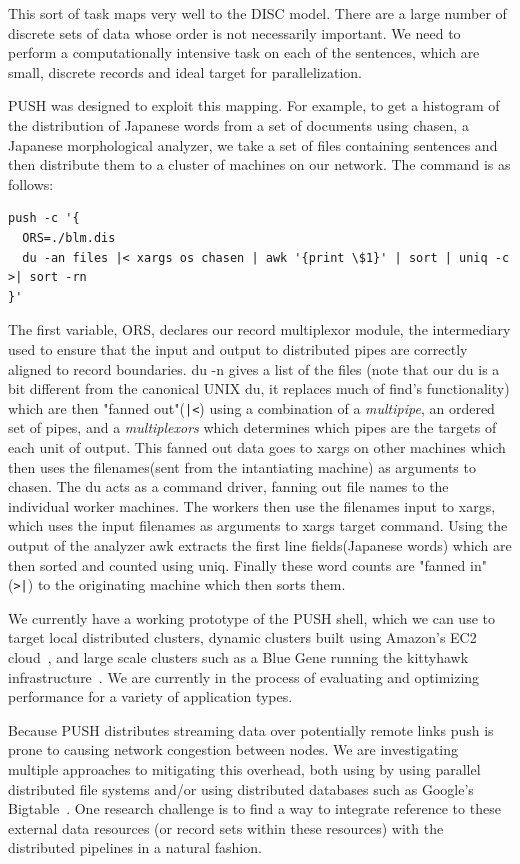 \documentclass[11pt, letterpaper]{article}
\begin{document}
This sort of task maps very well to the DISC model. There are a large number of 
discrete sets of data whose order is not necessarily important. We need to 
perform a computationally intensive task on each of the sentences, which are 
small, discrete records and ideal target for parallelization. 

PUSH was designed to exploit this mapping. For example, to get a histogram of 
the distribution of Japanese words from a set of documents using chasen, 
a Japanese morphological analyzer, we take a set of files containing sentences 
and then distribute them to a cluster of machines on our network. The command 
is as follows:
\begin{verbatim}
push -c '{
  ORS=./blm.dis
  du -an files |< xargs os chasen | awk '{print \$1}' | sort | uniq -c >| sort -rn
}'
\end{verbatim}

The first variable, ORS, declares our record multiplexor module, the intermediary 
used to ensure that the input and output to distributed pipes are correctly 
aligned to record boundaries. du -n gives a list of the files (note that our 
du is a bit different from the canonical UNIX du, it replaces much of find's 
functionality) which are then "fanned out"(\verb!|<!) using a combination 
of a \emph{multipipe}, an ordered set of pipes, and a \emph{multiplexors} 
which determines which pipes are the targets of each unit of output.  
This fanned out data goes to xargs on other machines which 
then uses the filenames(sent from the intantiating machine) as arguments to 
chasen. The du acts as a command driver, fanning out file names to the 
individual worker machines. The workers then use the filenames input to 
xargs, which uses the input filenames as arguments to xargs target command. 
Using the output of the analyzer awk extracts the first line fields(Japanese 
words) which are then sorted and counted using uniq.  Finally these word 
counts are "fanned in"(\verb!>|!) to the originating machine which then 
sorts them. 

We currently have a working prototype of the PUSH shell, which we can use
to target local distributed clusters, dynamic clusters built using Amazon's
EC2 cloud~\cite{amazon:aec}, and large scale clusters such as a Blue Gene 
running the kittyhawk infrastructure~\cite{appavoo2008pkb}.  We are currently
in the process of evaluating and optimizing performance for a variety of 
application types.

Because PUSH distributes streaming data over potentially remote links push 
is prone to causing network congestion between nodes. 
We are investigating multiple approaches to mitigating this overhead, both
using by using parallel distributed file systems and/or using distributed
databases such as Google's Bigtable~\cite{chang2006bds}.
One research challenge is to find a way to integrate reference to these
external data resources (or record sets within these resources) with the
distributed pipelines in a natural fashion.
\end{document}
